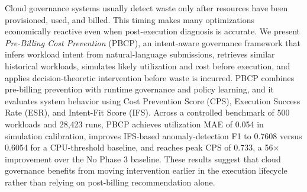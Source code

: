Cloud governance systems usually detect waste only after resources have been
provisioned, used, and billed. This timing makes many optimizations economically
reactive even when post-execution diagnosis is accurate. We present
\emph{Pre-Billing Cost Prevention} (PBCP), an intent-aware governance framework
that infers workload intent from natural-language submissions, retrieves similar
historical workloads, simulates likely utilization and cost before execution, and
applies decision-theoretic intervention before waste is incurred. PBCP combines
pre-billing prevention with runtime governance and policy learning, and it
evaluates system behavior using Cost Prevention Score (CPS), Execution Success
Rate (ESR), and Intent-Fit Score (IFS). Across a controlled benchmark of 500
workloads and 28{,}423 runs, PBCP achieves utilization MAE of 0.054 in
simulation calibration, improves IFS-based anomaly-detection F1 to 0.7608
versus 0.6054 for a CPU-threshold baseline, and reaches peak CPS of 0.733, a
56$\times$ improvement over the No Phase 3 baseline. These results suggest that
cloud governance benefits from moving intervention earlier in the execution
lifecycle rather than relying on post-billing recommendation alone.
